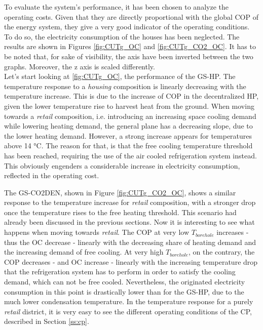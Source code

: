 \documentclass{article}
\begin{document}
To evaluate the system's performance, it has been chosen to analyze the operating costs. Given that they are directly proportional with the global COP of the energy system, they give a very good indicator of the operating conditions. To do so, the electricity consumption of the houses has been neglected. The results are shown in Figures \ref{fig:CUTg_OC} and \ref{fig:CUTg_CO2_OC}. It has to be noted that, for sake of visibility, the axis have been inverted between the two graphs. Moreover, the z axis is scaled differently.\\

Let's start looking at \ref{fig:CUTg_OC}, the performance of the GS-HP. The temperature response to a \textit{housing} composition is linearly decreasing with the temperature increase. This is due to the increase of COP in the decentralized HP, given the lower temperature rise to harvest heat from the ground. When moving towards a \textit{retail} composition, i.e. introducing an increasing space cooling demand while lowering heating demand, the general plane has a decreasing slope, due to the lower heating demand. However, a strong increase appears for temperatures above 14 \si{\celsius}. The reason for that, is that the free cooling temperature threshold has been reached, requiring the use of the air cooled refrigeration system instead. This obviously engenders a considerable increase in electricity consumption, reflected in the operating cost.

The GS-CO2DEN, shown in Figure \ref{fig:CUTg_CO2_OC}, shows a similar response to the temperature increase for \textit{retail} composition, with a stronger drop once the temperature rises to the free heating threshold. This scenario had already been discussed in the previous sections. Now it is interesting to see what happens when moving towards \textit{retail}. The COP at very low $T_{borehole}$ increases - thus the OC decrease - linearly with the decreasing share of heating demand and the increasing demand of free cooling. At very high $T_{borehole}$, on the contrary, the COP decreases - and OC increase - linearly with the increasing temperature drop that the refrigeration system has to perform in order to satisfy the cooling demand, which can not be free cooled. Nevertheless, the originated electricity consumption in this point is drastically lower than for the GS-HP, due to the much lower condensation temperature. In the temperature response for a purely \textit{retail} district, it is very easy to see the different operating conditions of the CP, described in Section  \ref{ss:cp}. 
\end{document}

